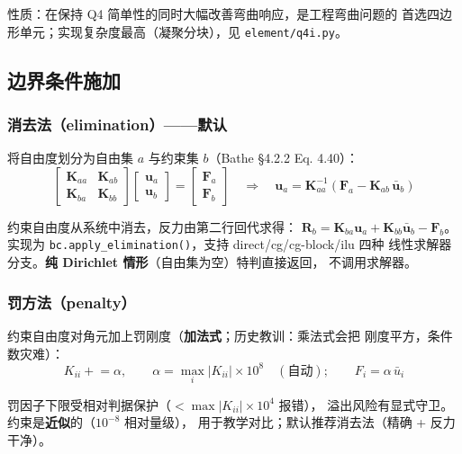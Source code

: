 \documentclass[12pt,a4paper]{ctexart}
\newcommand{\fem}{\Verb}
\begin{document}
性质：在保持 Q4 简单性的同时大幅改善弯曲响应，是工程弯曲问题的
首选四边形单元；实现复杂度最高（凝聚分块），见 \fem|element/q4i.py|。

\subsection{边界条件施加}

\subsubsection{消去法（elimination）——默认}

将自由度划分为自由集 $a$ 与约束集 $b$（Bathe §4.2.2 Eq. 4.40）：
\begin{equation}
\begin{bmatrix} \mathbf{K}_{aa} & \mathbf{K}_{ab} \\ \mathbf{K}_{ba} & \mathbf{K}_{bb} \end{bmatrix}
\begin{bmatrix} \mathbf{u}_a \\ \mathbf{u}_b \end{bmatrix}
= \begin{bmatrix} \mathbf{F}_a \\ \mathbf{F}_b \end{bmatrix}
\quad\Longrightarrow\quad
\mathbf{u}_a = \mathbf{K}_{aa}^{-1}\left(\mathbf{F}_a - \mathbf{K}_{ab}\,\bar{\mathbf{u}}_b\right)
\end{equation}

约束自由度从系统中消去，反力由第二行回代求得：
$\mathbf{R}_b = \mathbf{K}_{ba}\mathbf{u}_a + \mathbf{K}_{bb}\bar{\mathbf{u}}_b - \mathbf{F}_b$。
实现为 \fem|bc.apply_elimination()|，支持 direct/cg/cg-block/ilu 四种
线性求解器分支。\textbf{纯 Dirichlet 情形}（自由集为空）特判直接返回，
不调用求解器。

\subsubsection{罚方法（penalty）}

约束自由度对角元加上罚刚度（\textbf{加法式}；历史教训：乘法式会把
刚度平方，条件数灾难）：
\begin{equation}
K_{ii} \mathrel{+}= \alpha, \qquad
\alpha = \max_i |K_{ii}| \times 10^{8} \quad(\text{自动}); \qquad
F_i = \alpha\,\bar{u}_i
\end{equation}

罚因子下限受相对判据保护（$< \max|K_{ii}|\times 10^4$ 报错），
溢出风险有显式守卫。约束是\textbf{近似}的（$10^{-8}$ 相对量级），
用于教学对比；默认推荐消去法（精确 + 反力干净）。
\end{document}
